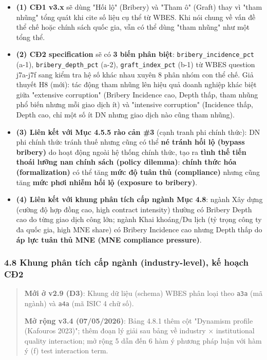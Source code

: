 \documentclass[12pt,a4paper]{article}
\providecommand{\tightlist}{\setlength{\itemsep}{0pt}\setlength{\parskip}{0pt}}
\begin{document}
\begin{itemize}
\tightlist
\item
  \textbf{(1) CĐ1 v3.x} sẽ dùng "Hối lộ" (Bribery) và "Tham ô" (Graft)
  thay vì "tham nhũng" tổng quát khi cite số liệu cụ thể từ WBES. Khi
  nói chung về vấn đề thể chế hoặc chính sách quốc gia, vẫn có thể dùng
  "tham nhũng" như một tổng thể.
\item
  \textbf{(2) CĐ2 specification} sẽ có \textbf{3 biến phân biệt}:
  \texttt{bribery\_incidence\_pct} (a-1), \texttt{bribery\_depth\_pct}
  (a-2), \texttt{graft\_index\_pct} (b-1) từ WBES question j7a-j7f sang
  kiểm tra hệ số khác nhau xuyên 8 phân nhóm con thể chế. Giả thuyết H8
  (mới): tác động tham nhũng lên hiệu quả doanh nghiệp khác biệt giữa
  "extensive corruption" (Bribery Incidence cao, Depth thấp, tham nhũng
  phổ biến nhưng mỗi giao dịch ít) và "intensive corruption" (Incidence
  thấp, Depth cao, chỉ một số ít DN nhưng giao dịch nào cũng tham
  nhũng).
\item
  \textbf{(3) Liên kết với Mục 4.5.5 rào cản \#3} (cạnh tranh phi chính
  thức): DN phi chính thức tránh thuế nhưng cũng có thể \textbf{né tránh
  hối lộ (bypass bribery)} do hoạt động ngoài hệ thống chính thức, tạo
  ra \textbf{tình thế tiến thoái lưỡng nan chính sách (policy dilemma)}:
  \textbf{chính thức hóa (formalization)} có thể tăng \textbf{mức độ
  tuân thủ (compliance)} nhưng cũng tăng \textbf{mức phơi nhiễm hối lộ
  (exposure to bribery)}.
\item
  \textbf{(4) Liên kết với khung phân tích cấp ngành Mục 4.8}: ngành Xây
  dựng (cường độ hợp đồng cao, high contract intensity) thường có
  Bribery Depth cao do từng giao dịch công lớn; ngành Khai khoáng/Du
  lịch (tỷ trọng công ty đa quốc gia, high MNE share) có Bribery
  Incidence cao nhưng Depth thấp do \textbf{áp lực tuân thủ MNE (MNE
  compliance pressure)}.
\end{itemize}

\hypertarget{48-khung-phuxe2n-tuxedch-cux1ea5p-nguxe0nh-industry-level-kux1ebf-houx1ea1ch-cux1112}{%
\subsubsection{4.8 Khung phân tích cấp ngành (industry-level), kế hoạch
CĐ2}\label{48-khung-phuxe2n-tuxedch-cux1ea5p-nguxe0nh-industry-level-kux1ebf-houx1ea1ch-cux1112}}

\begin{quote}
\textbf{Mới ở v2.9 (D3)}: Khung dữ liệu (schema) WBES phân loại theo
\texttt{a3a} (mã ngành) và \texttt{a4a} (mã ISIC 4 chữ số).

\textbf{Mở rộng v3.4 (07/05/2026)}: Bảng 4.8.1 thêm cột "Dynamism
profile (Kafouros 2023)"; thêm đoạn lý giải sau bảng về industry ×
institutional quality interaction; mở rộng 5 dẫn đến 6 hàm ý phương pháp
luận với hàm ý (f) test interaction term.
\end{quote}
\end{document}
